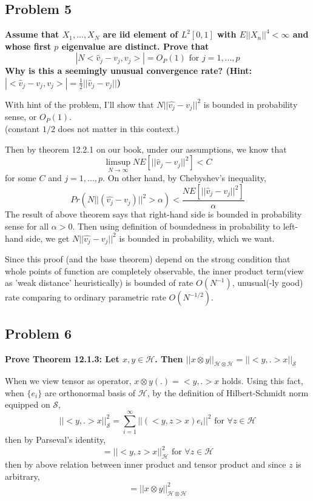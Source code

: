 \documentclass{article}
\begin{document}
\subsection{Problem 5}
\textbf{
Assume that $X_1,...,X_N$ are iid element of $L^2[0,1]$ with
$E||X_n||^4<\infty$ and whose first $p$ eigenvalue are distinct.
Prove that
\[|N<\hat{v}_j-v_j,v_j>|=O_P(1) \text{ for } j=1,...,p\]
Why is this a seemingly unusual convergence rate? 
(Hint: \(|<\hat{v}_j-v_j,v_j>|=\frac{1}{2}||\hat{v}_j-v_j||\))
}

With hint of the problem, I'll show that
\(N||\hat{v_j}-v_j||^2\) is bounded in probability sense, or $O_P(1)$.\\
(constant $1/2$ does not matter in this context.)

Then by theorem 12.2.1 on our book, under our assumptions, we know that
\[\limsup_{N\rightarrow \infty} NE[||\hat{v}_j-v_j||^2]<C\]
for some $C$ and $j=1,...,p$. 
On other hand, by Chebyshev's inequality,
\[Pr(N||(\hat{v_j}-v_j)||^2>\alpha)<\frac{NE[||\hat{v}_j-v_j||^2]}{\alpha}\]
The result of above theorem says that right-hand side is bounded in probability sense for all $\alpha>0$.
Then using definition of boundedness in probability to left-hand side,
we get \(N||\hat{v_j}-v_j||^2\) is bounded in probability, which we want.

Since this proof (and the base theorem) depend on the strong condition that whole points of function are completely observable, 
the inner product term(view as 'weak distance' heuristically) is bounded of rate $O(N^{-1})$,
unusual(-ly good) rate comparing to ordinary parametric rate $O(N^{-1/2})$. 


\subsection{Problem 6}
\textbf{
Prove Theorem 12.1.3:
Let $x,y\in\mathcal{H}$. Then
\(||x\otimes y||_{\mathcal{H}\otimes\mathcal{H}}=
||<y,.>x||_{\mathcal{S}}\)
}

When we view tensor as operator, \(x\otimes y(.)=<y,.>x\) holds. 
Using this fact, when $\{e_i\}$ are orthonormal basis of $\mathcal{H}$,
by the definition of Hilbert-Schmidt norm equipped on $\mathcal{S}$,
\[||<y,.>x||^2_{\mathcal{S}}=\sum_{i=1}^{\infty}||(<y,z>x)e_i||^2 \text{ for } \forall z\in\mathcal{H}\]
then by Parseval's identity,
\[=||<y,z>x||^2_{\mathcal{H}} \text{ for } \forall z\in\mathcal{H}\]
then by above relation between inner product and tensor product and since $z$ is arbitrary,
\[=||x\otimes y||^2_{\mathcal{H}\otimes\mathcal{H}}\]
\end{document}

